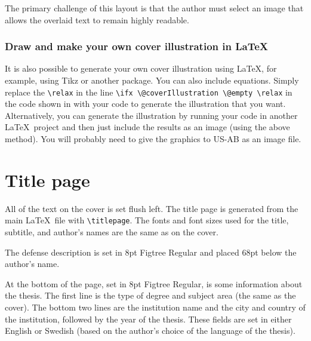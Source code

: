 \documentclass[12pt, twoside]{article}
\begin{document}
The primary challenge of this layout is that the author must select an image that allows the overlaid text to remain highly readable.



\subsubsection{Draw and make your own cover illustration in \LaTeX{}}
It is also possible to generate your own cover illustration using \LaTeX{}, for example, using Tikz or another package. You can also include equations. Simply replace the \texttt{\textbackslash relax} in the line \texttt{\textbackslash ifx  \textbackslash @coverIllustration \textbackslash @empty \textbackslash relax}  
in the code shown in  with your code to generate the illustration that you want. Alternatively, you can generate the illustration by running your code in another \LaTeX\ project and then just include the results as an image (using the above method). You will probably need to give the graphics to US-AB as an image file.


\section{Title page}
\label{sec:cycle3Titlepage}


All of the text on the cover is set flush left. The title page is generated from the main \LaTeX\ file with \texttt{\textbackslash titlepage}.
The fonts and font sizes used for the title, subtitle, and author's names are the same as on the cover.

The defense description is set in 8pt Figtree Regular and placed 68pt below the author's name.

At the bottom of the page, set in 8pt Figtree Regular, is some information about the thesis. The first line is the type of degree and subject area (the same as the cover). The bottom two lines are \first the institution name and  \Second the city and country of the institution, followed by the year of the thesis. These fields are set in either English or Swedish (based on the author's choice of the language of the thesis).
\end{document}
